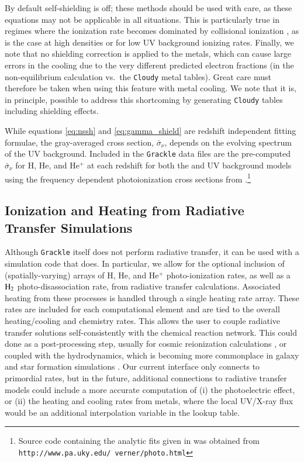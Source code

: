 By default self-shielding is off; these methods should be used with care, as these equations may not be applicable in all situations. This is particularly true in regimes where the ionization rate becomes dominated by collisional ionization \citep{2013MNRAS.430.2427R}, as is the case at high densities or for low UV background ionizing rates.  Finally, we note that no shielding correction is applied to the metals, which can cause large errors in the cooling due to the very different predicted electron fractions (in the non-equilibrium calculation vs.\ the \texttt{Cloudy} metal tables). Great care must therefore be taken when using this feature with metal cooling.  We note that it is, in principle, possible to address this shortcoming by generating \texttt{Cloudy} tables including shielding effects.

While equations \ref{eq:nssh} and \ref{eq:gamma_shield} are redshift independent fitting formulae, the gray-averaged cross section, $\bar{\sigma}_{\nu}$, depends on the evolving spectrum of the UV background. Included in the \texttt{Grackle} data files are the pre-computed $\bar{\sigma}_{\nu}$ for H, He, and He$^+$ at each redshift for both the \citet{2009ApJ...703.1416F} and \citet{2012ApJ...746..125H} UV background models using the frequency dependent photoionization cross sections from \citet{1996ApJ...465..487V}.\footnote{Source code containing the analytic fits given in \citet{1996ApJ...465..487V} was obtained from \texttt{http://www.pa.uky.edu/~verner/photo.html}}


\subsection{Ionization and Heating from Radiative Transfer Simulations}
\label{section:radiative-transfer}

Although \texttt{Grackle} itself does not perform radiative transfer, it can be used with a simulation code that does.  In particular, we allow for the optional inclusion of (spatially-varying) arrays of H, He, and He$^+$ photo-ionization rates, as well as a $\rm{H}_2$ photo-disassociation rate, from radiative transfer calculations. Associated heating from these processes is handled through a single heating rate array. These rates are included for each computational element and are tied to the overall heating/cooling and chemistry rates. This allows the user to couple radiative transfer solutions self-consistently with the chemical reaction network.  This could done as a post-processing step, usually for cosmic reionization calculations \citep[e.g.][]{2014MNRAS.439..725I, 2016MNRAS.459.2342M}, or coupled with the hydrodynamics, which is becoming more commonplace in galaxy and star formation simulations \citep[e.g.][]{2014MNRAS.442.2560W, 2015MNRAS.451...34R,  2015arXiv151100011O, 2015MNRAS.454..380B, 2016arXiv160300034P, 2016arXiv160703117R}.  Our current interface only connects to primordial rates, but in the future, additional connections to radiative transfer models could include a more accurate computation of (i) the photoelectric effect, or (ii) the heating and cooling rates from metals, where the local UV/X-ray flux would be an additional interpolation variable in the lookup table.


